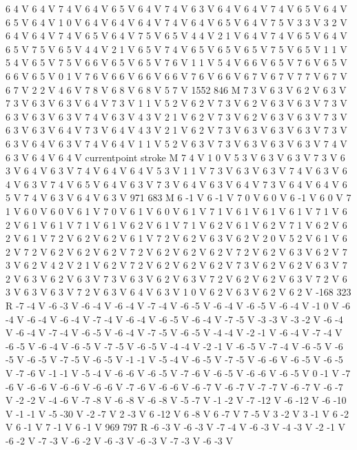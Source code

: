 {6 4 V
6 4 V
7 4 V
6 4 V
6 5 V
6 4 V
7 4 V
6 3 V
6 4 V
6 4 V
7 4 V
6 5 V
6 4 V
6 5 V
6 4 V
1 0 V
6 4 V
6 4 V
6 4 V
7 4 V
6 4 V
6 5 V
6 4 V
7 5 V
3 3 V
3 2 V
6 4 V
6 4 V
7 4 V
6 5 V
6 4 V
7 5 V
6 5 V
4 4 V
2 1 V
6 4 V
7 4 V
6 5 V
6 4 V
6 5 V
7 5 V
6 5 V
4 4 V
2 1 V
6 5 V
7 4 V
6 5 V
6 5 V
6 5 V
7 5 V
6 5 V
1 1 V
5 4 V
6 5 V
7 5 V
6 6 V
6 5 V
6 5 V
7 6 V
1 1 V
5 4 V
6 6 V
6 5 V
7 6 V
6 5 V
6 6 V
6 5 V
0 1 V
7 6 V
6 6 V
6 6 V
6 6 V
7 6 V
6 6 V
6 7 V
6 7 V
7 7 V
6 7 V
6 7 V
2 2 V
4 6 V
7 8 V
6 8 V
6 8 V
5 7 V
1552 846 M
7 3 V
6 3 V
6 2 V
6 3 V
7 3 V
6 3 V
6 3 V
6 4 V
7 3 V
1 1 V
5 2 V
6 2 V
7 3 V
6 2 V
6 3 V
6 3 V
7 3 V
6 3 V
6 3 V
6 3 V
7 4 V
6 3 V
4 3 V
2 1 V
6 2 V
7 3 V
6 2 V
6 3 V
6 3 V
7 3 V
6 3 V
6 3 V
6 4 V
7 3 V
6 4 V
4 3 V
2 1 V
6 2 V
7 3 V
6 3 V
6 3 V
6 3 V
7 3 V
6 3 V
6 4 V
6 3 V
7 4 V
6 4 V
1 1 V
5 2 V
6 3 V
7 3 V
6 3 V
6 3 V
6 3 V
7 4 V
6 3 V
6 4 V
6 4 V
currentpoint stroke M
7 4 V
1 0 V
5 3 V
6 3 V
6 3 V
7 3 V
6 3 V
6 4 V
6 3 V
7 4 V
6 4 V
6 4 V
5 3 V
1 1 V
7 3 V
6 3 V
6 3 V
7 4 V
6 3 V
6 4 V
6 3 V
7 4 V
6 5 V
6 4 V
6 3 V
7 3 V
6 4 V
6 3 V
6 4 V
7 3 V
6 4 V
6 4 V
6 5 V
7 4 V
6 3 V
6 4 V
6 3 V
971 683 M
6 -1 V
6 -1 V
7 0 V
6 0 V
6 -1 V
6 0 V
7 1 V
6 0 V
6 0 V
6 1 V
7 0 V
6 1 V
6 0 V
6 1 V
7 1 V
6 1 V
6 1 V
6 1 V
7 1 V
6 2 V
6 1 V
6 1 V
7 1 V
6 1 V
6 2 V
6 1 V
7 1 V
6 2 V
6 1 V
6 2 V
7 1 V
6 2 V
6 2 V
6 1 V
7 2 V
6 2 V
6 2 V
6 1 V
7 2 V
6 2 V
6 3 V
6 2 V
2 0 V
5 2 V
6 1 V
6 2 V
7 2 V
6 2 V
6 2 V
6 2 V
7 2 V
6 2 V
6 2 V
6 2 V
7 2 V
6 2 V
6 3 V
6 2 V
7 3 V
6 2 V
4 2 V
2 1 V
6 2 V
7 2 V
6 2 V
6 2 V
6 2 V
7 3 V
6 2 V
6 2 V
6 3 V
7 2 V
6 3 V
6 2 V
6 3 V
7 3 V
6 3 V
6 2 V
6 3 V
7 2 V
6 2 V
6 2 V
6 3 V
7 2 V
6 3 V
6 3 V
6 3 V
7 2 V
6 3 V
6 4 V
6 3 V
1 0 V
6 2 V
6 3 V
6 2 V
6 2 V
-168 323 R
-7 -4 V
-6 -3 V
-6 -4 V
-6 -4 V
-7 -4 V
-6 -5 V
-6 -4 V
-6 -5 V
-6 -4 V
-1 0 V
-6 -4 V
-6 -4 V
-6 -4 V
-7 -4 V
-6 -4 V
-6 -5 V
-6 -4 V
-7 -5 V
-3 -3 V
-3 -2 V
-6 -4 V
-6 -4 V
-7 -4 V
-6 -5 V
-6 -4 V
-7 -5 V
-6 -5 V
-4 -4 V
-2 -1 V
-6 -4 V
-7 -4 V
-6 -5 V
-6 -4 V
-6 -5 V
-7 -5 V
-6 -5 V
-4 -4 V
-2 -1 V
-6 -5 V
-7 -4 V
-6 -5 V
-6 -5 V
-6 -5 V
-7 -5 V
-6 -5 V
-1 -1 V
-5 -4 V
-6 -5 V
-7 -5 V
-6 -6 V
-6 -5 V
-6 -5 V
-7 -6 V
-1 -1 V
-5 -4 V
-6 -6 V
-6 -5 V
-7 -6 V
-6 -5 V
-6 -6 V
-6 -5 V
0 -1 V
-7 -6 V
-6 -6 V
-6 -6 V
-6 -6 V
-7 -6 V
-6 -6 V
-6 -7 V
-6 -7 V
-7 -7 V
-6 -7 V
-6 -7 V
-2 -2 V
-4 -6 V
-7 -8 V
-6 -8 V
-6 -8 V
-5 -7 V
-1 -2 V
-7 -12 V
-6 -12 V
-6 -10 V
-1 -1 V
-5 -30 V
-2 -7 V
2 -3 V
6 -12 V
6 -8 V
6 -7 V
7 -5 V
3 -2 V
3 -1 V
6 -2 V
6 -1 V
7 -1 V
6 -1 V
969 797 R
-6 -3 V
-6 -3 V
-7 -4 V
-6 -3 V
-4 -3 V
-2 -1 V
-6 -2 V
-7 -3 V
-6 -2 V
-6 -3 V
-6 -3 V
-7 -3 V
-6 -3 V
}

